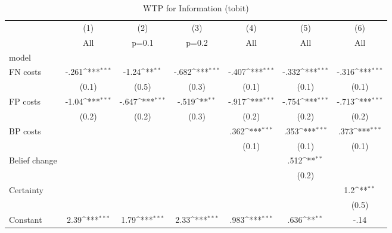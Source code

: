 \begin{table}[htbp]\centering
\def\sym#1{\ifmmode^{#1}\else\(^{#1}\)\fi}
\caption{WTP for Information (tobit)}
\begin{tabular}{l*{6}{c}}
\hline\hline
                &\multicolumn{1}{c}{(1)}&\multicolumn{1}{c}{(2)}&\multicolumn{1}{c}{(3)}&\multicolumn{1}{c}{(4)}&\multicolumn{1}{c}{(5)}&\multicolumn{1}{c}{(6)}\\
                &\multicolumn{1}{c}{All}&\multicolumn{1}{c}{p=0.1}&\multicolumn{1}{c}{p=0.2}&\multicolumn{1}{c}{All}&\multicolumn{1}{c}{All}&\multicolumn{1}{c}{All}\\
\hline
model           &                  &                  &                  &                  &                  &                  \\
FN costs        &    -.261\sym{***}&    -1.24\sym{**} &    -.682\sym{***}&    -.407\sym{***}&    -.332\sym{***}&    -.316\sym{***}\\
                &    (0.1)         &    (0.5)         &    (0.3)         &    (0.1)         &    (0.1)         &    (0.1)         \\
FP costs        &    -1.04\sym{***}&    -.647\sym{***}&    -.519\sym{**} &    -.917\sym{***}&    -.754\sym{***}&    -.713\sym{***}\\
                &    (0.2)         &    (0.2)         &    (0.3)         &    (0.2)         &    (0.2)         &    (0.2)         \\
BP costs        &                  &                  &                  &     .362\sym{***}&     .353\sym{***}&     .373\sym{***}\\
                &                  &                  &                  &    (0.1)         &    (0.1)         &    (0.1)         \\
Belief change   &                  &                  &                  &                  &     .512\sym{**} &                  \\
                &                  &                  &                  &                  &    (0.2)         &                  \\
Certainty       &                  &                  &                  &                  &                  &      1.2\sym{**} \\
                &                  &                  &                  &                  &                  &    (0.5)         \\
Constant        &     2.39\sym{***}&     1.79\sym{***}&     2.33\sym{***}&     .983\sym{***}&     .636\sym{**} &     -.14         \\

\end{tabular}
\end{table}
